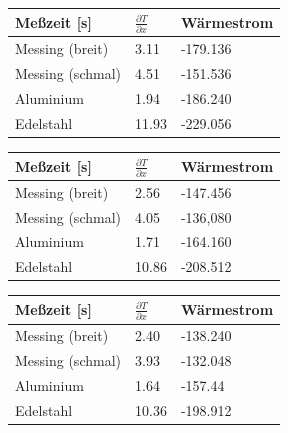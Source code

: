 \begin{minipage}{\linewidth}
    \begin{table}[H]
        \centering
    \begin{tabular}{lll}
        \toprule
        Meßzeit [s] & $\frac{\partial T}{\partial x}$ & Wärmestrom  \\
        \midrule
        Messing (breit) & 3.11 & -179.136 \\
        Messing (schmal) & 4.51 & -151.536 \\
        Aluminium & 1.94 & -186.240 \\
        Edelstahl & 11.93 & -229.056 \\
        \bottomrule   
    \end{tabular}
    
    \label{tab:2}
\end{table}
\end{minipage}

\begin{minipage}{\linewidth}
    \begin{table}[H]
        \centering
    \begin{tabular}{lll}
        \toprule
        Meßzeit [s] & $\frac{\partial T}{\partial x}$ & Wärmestrom  \\
        \midrule
        Messing (breit) & 2.56 & -147.456 \\
        Messing (schmal) & 4.05 & -136,080 \\
        Aluminium & 1.71 & -164.160 \\
        Edelstahl & 10.86 & -208.512 \\
        \bottomrule   
    \end{tabular}
    
    \label{tab:3}
\end{table}
\end{minipage}

\begin{minipage}{\linewidth}
    \begin{table}[H]
        \centering
    \begin{tabular}{lll}
        \toprule
        Meßzeit [s] & $\frac{\partial T}{\partial x}$ & Wärmestrom  \\
        \midrule
        Messing (breit) & 2.40 & -138.240 \\
        Messing (schmal) & 3.93 & -132.048 \\
        Aluminium & 1.64 & -157.44 \\
        Edelstahl & 10.36 & -198.912 \\
        \bottomrule   
    \end{tabular}
    
    \label{tab:4}
\end{table}
\end{minipage}

